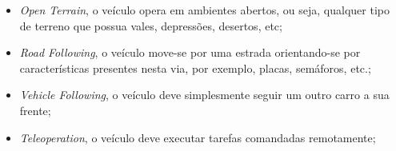 \documentclass[conference]{IEEEtran}
\begin{document}
\begin{itemize}
	\item \textit{Open Terrain}, o veículo opera em ambientes abertos, ou seja, qualquer tipo de terreno que possua vales, depressões, desertos, etc;
	\item \textit{Road Following}, o veículo move-se por uma estrada orientando-se por características presentes nesta via, por exemplo, placas, semáforos, etc.;
	\item \textit{Vehicle Following}, o veículo deve simplesmente seguir um outro carro a sua frente;
	\item \textit{Teleoperation}, o veículo deve executar tarefas comandadas remotamente;
\end{itemize}




\end{document}
